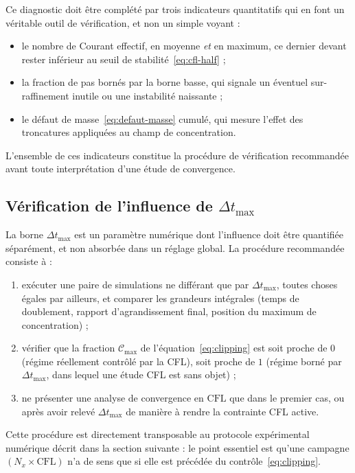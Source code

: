 \documentclass[11pt,a4paper]{report}
\newcommand{\dt}{\Delta t}
\begin{document}
Ce diagnostic doit être complété par trois indicateurs quantitatifs qui en font un véritable outil de
vérification, et non un simple voyant :
\begin{itemize}
  \item le nombre de Courant effectif, en moyenne \emph{et} en maximum, ce dernier devant rester inférieur
        au seuil de stabilité~\eqref{eq:cfl-half} ;
  \item la fraction de pas bornés par la borne basse, qui signale un éventuel sur-raffinement inutile ou
        une instabilité naissante ;
  \item le défaut de masse~\eqref{eq:defaut-masse} cumulé, qui mesure l'effet des troncatures appliquées au
        champ de concentration.
\end{itemize}
L'ensemble de ces indicateurs constitue la procédure de vérification recommandée avant toute
interprétation d'une étude de convergence.

\subsection{Vérification de l'influence de \(\dt_{\max}\)}
\label{sec:dtmax}

La borne \(\dt_{\max}\) est un paramètre numérique dont l'influence doit être quantifiée séparément, et non
absorbée dans un réglage global. La procédure recommandée consiste à :
\begin{enumerate}[label=\arabic*.]
  \item exécuter une paire de simulations ne différant que par \(\dt_{\max}\), toutes choses égales par
        ailleurs, et comparer les grandeurs intégrales (temps de doublement, rapport d'agrandissement
        final, position du maximum de concentration) ;
  \item vérifier que la fraction \(\mathcal{C}_{\max}\) de l'équation~\eqref{eq:clipping} est soit proche de
        \(0\) (régime réellement contrôlé par la CFL), soit proche de \(1\) (régime borné par
        \(\dt_{\max}\), dans lequel une étude CFL est sans objet) ;
  \item ne présenter une analyse de convergence en \(\mathrm{CFL}\) que dans le premier cas, ou après
        avoir relevé \(\dt_{\max}\) de manière à rendre la contrainte CFL active.
\end{enumerate}
Cette procédure est directement transposable au protocole expérimental numérique décrit dans la section
suivante : le point essentiel est qu'une campagne \((N_x \times \mathrm{CFL})\) n'a de sens que si elle est
précédée du contrôle~\eqref{eq:clipping}.
\end{document}
